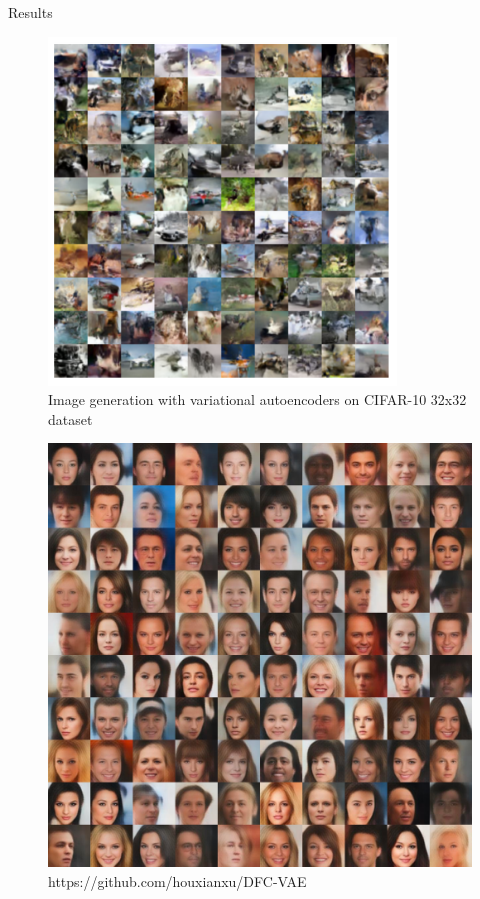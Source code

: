 \begin{frame}[allowframebreaks]{Results}
\framebreak

\begin{figure}
        \centering
        \includegraphics[height=0.8\textheight, width=\textwidth, keepaspectratio]{images/vae/result-cifar.png}
        \caption*{Image generation with variational autoencoders on CIFAR-10 32x32 dataset}
\end{figure}

\framebreak

\begin{figure}
        \centering
        \includegraphics[height=0.8\textheight, width=\textwidth, keepaspectratio]{images/vae/result-face.png}
        \caption*{https://github.com/houxianxu/DFC-VAE}
\end{figure}
\end{frame}